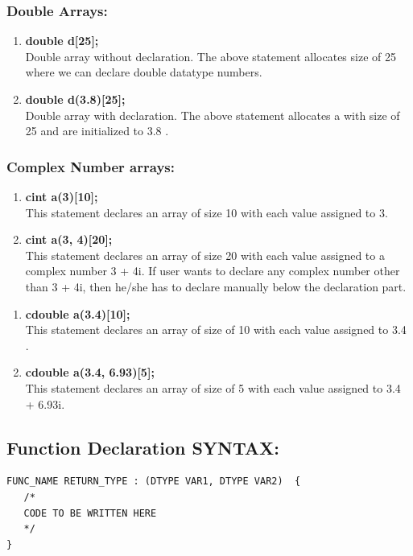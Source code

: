 \documentclass[12pt]{article}
\begin{document}
\subsubsection{Double Arrays:} 
\begin{enumerate}
    \item \textbf{double d[25]; } \\
Double array without declaration.
The above statement allocates size of 25 where we can declare double datatype numbers.
\item \textbf{double d(3.8)[25]; } \\
Double array with declaration.
The above statement allocates a with size of 25 and are initialized to 3.8 .
\end{enumerate}
\subsubsection{Complex Number arrays:}
 \begin{enumerate}
     \item \textbf{cint a(3)[10];} \\
This statement declares an array of size 10 with each value assigned to 3.
     \item  \textbf{cint a(3, 4)[20];}\\ 
This statement declares an array of size 20 with each value assigned to a complex number 3 + 4i. If user wants to declare any complex number other 
than 3 + 4i, then he/she has to declare manually below the declaration part.
 \end{enumerate}
 \begin{enumerate}
    \item \textbf{cdouble a(3.4)[10];} \\
This statement declares an array of size of 10 with each value assigned to 3.4 .
\item \textbf{cdouble a(3.4, 6.93)[5];} \\
This statement declares an array of size of 5 with each value assigned to 3.4 + 6.93i.
 \end{enumerate}

\subsection{Function Declaration SYNTAX:}
    \begin{BVerbatim} 
FUNC_NAME RETURN_TYPE : (DTYPE VAR1, DTYPE VAR2)  {
   /*
   CODE TO BE WRITTEN HERE
   */
}
    \end{BVerbatim}
\end{document}
